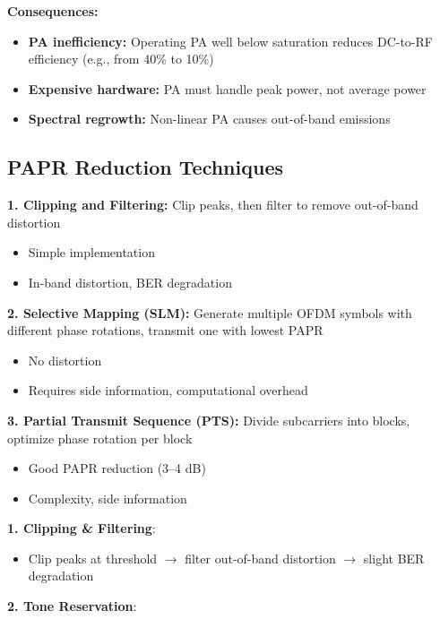 \textbf{Consequences:}
\begin{itemize}
\item[\texttimes] \textbf{PA inefficiency:} Operating PA well below saturation reduces DC-to-RF efficiency (e.g., from 40\% to 10\%)
\item[\texttimes] \textbf{Expensive hardware:} PA must handle peak power, not average power
\item[\texttimes] \textbf{Spectral regrowth:} Non-linear PA causes out-of-band emissions
\end{itemize}

\subsection{PAPR Reduction Techniques}

\textbf{1. Clipping and Filtering:} Clip peaks, then filter to remove out-of-band distortion
\begin{itemize}
\item[\checkmark] Simple implementation
\item[\texttimes] In-band distortion, BER degradation
\end{itemize}

\textbf{2. Selective Mapping (SLM):} Generate multiple OFDM symbols with different phase rotations, transmit one with lowest PAPR
\begin{itemize}
\item[\checkmark] No distortion
\item[\texttimes] Requires side information, computational overhead
\end{itemize}

\textbf{3. Partial Transmit Sequence (PTS):} Divide subcarriers into blocks, optimize phase rotation per block
\begin{itemize}
\item[\checkmark] Good PAPR reduction (3--4 dB)
\item[\texttimes] Complexity, side information
\end{itemize}

\textbf{1. Clipping \& Filtering}:

\begin{itemize}
\item Clip peaks at threshold $\rightarrow$ filter out-of-band distortion $\rightarrow$ slight BER degradation
\end{itemize}

\textbf{2. Tone Reservation}:

